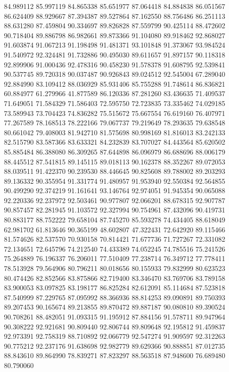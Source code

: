 84.989112
85.997119
84.865338
85.651977
87.064418
84.884838
86.051567
86.624409
88.929667
87.394387
89.527864
87.162550
88.756486
86.251113
88.631280
87.459804
90.334697
89.826828
87.559799
90.425114
88.472602
90.718404
89.886798
86.982661
89.873366
91.104080
89.918462
92.868027
91.603874
91.067213
91.198498
91.481371
93.101848
91.373067
93.984524
91.540972
92.324481
91.732886
90.495030
89.611657
91.897157
90.118318
92.899906
91.000436
92.478316
90.458230
91.578378
91.608795
92.539841
90.537745
89.720318
90.037487
90.926843
89.024512
92.545004
67.289040
92.884990
83.109412
88.036929
85.931406
85.755288
91.748614
86.836821
60.884977
61.279966
41.877589
86.120336
87.281260
83.436635
71.409537
71.649051
71.584329
71.586403
72.595750
72.723835
73.335462
74.029185
73.589943
73.704423
74.836282
75.515672
75.667554
76.619160
76.407971
77.267589
78.168513
78.222166
79.067737
79.219649
78.293635
79.638548
80.661042
79.408003
81.942710
81.575698
80.998169
81.816013
83.242133
82.515790
83.587366
83.633321
84.232839
83.707027
84.443564
85.620502
85.885484
86.388080
86.309265
87.644898
86.096979
86.688696
88.006179
88.445512
87.541815
89.145115
89.018113
90.162378
88.352267
89.072053
88.039511
91.422370
90.239530
88.446645
90.825608
89.788002
89.203293
89.136332
90.355954
91.331774
91.480957
91.953940
92.550384
92.564855
90.499290
92.374219
91.161641
93.146764
92.974051
91.945354
90.065088
92.220336
92.237972
92.503461
90.977807
92.066201
88.678315
92.907787
90.857457
82.281945
91.103572
92.327994
90.754961
87.432096
90.419731
80.883177
88.752222
79.658104
87.745270
85.593278
74.434405
88.618049
62.981702
61.813646
90.365199
48.602807
47.322431
72.642920
89.115466
81.574626
82.537570
70.930158
70.814421
71.677736
71.727267
72.331082
72.134651
72.645796
74.212540
74.433389
74.052245
74.785516
75.241526
75.264889
76.196337
76.206011
77.510409
77.238714
76.349712
77.778411
78.513928
79.564906
80.796211
80.018656
80.155933
79.832999
80.623523
80.474426
82.852566
83.875866
82.719400
83.346470
83.769706
83.789158
83.900053
83.097825
83.198177
86.825284
82.612091
85.114684
87.523818
87.540999
87.229765
87.095992
88.366936
88.814253
89.090891
89.750393
89.207453
90.165674
89.213855
89.870472
89.887187
90.080810
89.390524
90.708261
88.482051
91.093315
91.195912
87.884156
91.578711
89.947964
90.308222
92.921681
90.809440
92.806744
89.809648
92.195812
91.459837
92.973391
92.758319
88.710892
92.066779
92.547274
91.909597
92.312263
90.775212
92.237176
91.638698
92.982779
89.629366
90.888851
87.012735
88.843610
89.864990
78.839271
87.823297
88.563518
87.948600
76.689480
80.790060
